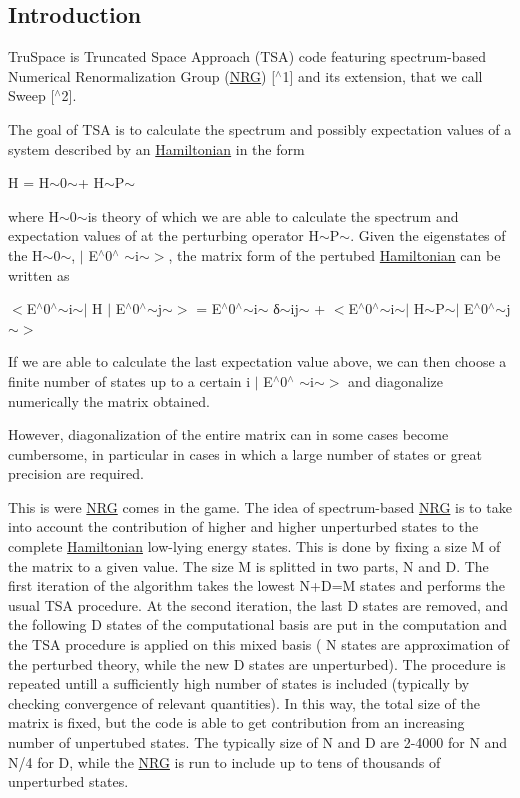 \subsection*{Introduction }

Tru\+Space is Truncated Space Approach ({\ttfamily T\+SA}) code featuring spectrum-\/based Numerical Renormalization Group ({\ttfamily \mbox{\hyperlink{classNRG}{N\+RG}}}) \mbox{[}$^\wedge$1\mbox{]} and its extension, that we call {\ttfamily Sweep} \mbox{[}$^\wedge$2\mbox{]}.

The goal of {\ttfamily T\+SA} is to calculate the spectrum and possibly expectation values of a system described by an \mbox{\hyperlink{classHamiltonian}{Hamiltonian}} in the form

H = H$\sim$0$\sim$+ H$\sim$\+P$\sim$

where H$\sim$0$\sim$is theory of which we are able to calculate the spectrum and expectation values of at the perturbing operator H$\sim$\+P$\sim$. Given the eigenstates of the H$\sim$0$\sim$, $\vert$ E$^\wedge$0$^\wedge$ $\sim$i$\sim$$>$, the matrix form of the pertubed \mbox{\hyperlink{classHamiltonian}{Hamiltonian}} can be written as

$<$E$^\wedge$0$^\wedge$$\sim$i$\sim$$\vert$ H $\vert$ E$^\wedge$0$^\wedge$$\sim$j$\sim$$>$ = E$^\wedge$0$^\wedge$$\sim$i$\sim$ δ$\sim$ij$\sim$ + $<$E$^\wedge$0$^\wedge$$\sim$i$\sim$$\vert$ H$\sim$\+P$\sim$$\vert$ E$^\wedge$0$^\wedge$$\sim$j$\sim$$>$

If we are able to calculate the last expectation value above, we can then choose a finite number of states up to a certain i $\vert$ E$^\wedge$0$^\wedge$ $\sim$i$\sim$$>$ and diagonalize numerically the matrix obtained.

However, diagonalization of the entire matrix can in some cases become cumbersome, in particular in cases in which a large number of states or great precision are required.

This is were {\ttfamily \mbox{\hyperlink{classNRG}{N\+RG}}} comes in the game. The idea of spectrum-\/based {\ttfamily \mbox{\hyperlink{classNRG}{N\+RG}}} is to take into account the contribution of higher and higher unperturbed states to the complete \mbox{\hyperlink{classHamiltonian}{Hamiltonian}} low-\/lying energy states. This is done by fixing a size M of the matrix to a given value. The size M is splitted in two parts, N and D. The first iteration of the algorithm takes the lowest N+D=M states and performs the usual {\ttfamily T\+SA} procedure. At the second iteration, the last D states are removed, and the following D states of the computational basis are put in the computation and the {\ttfamily T\+SA} procedure is applied on this mixed basis ( N states are approximation of the perturbed theory, while the new D states are unperturbed). The procedure is repeated untill a sufficiently high number of states is included (typically by checking convergence of relevant quantities). In this way, the total size of the matrix is fixed, but the code is able to get contribution from an increasing number of unpertubed states. The typically size of N and D are 2-\/4000 for N and N/4 for D, while the {\ttfamily \mbox{\hyperlink{classNRG}{N\+RG}}} is run to include up to tens of thousands of unperturbed states.

